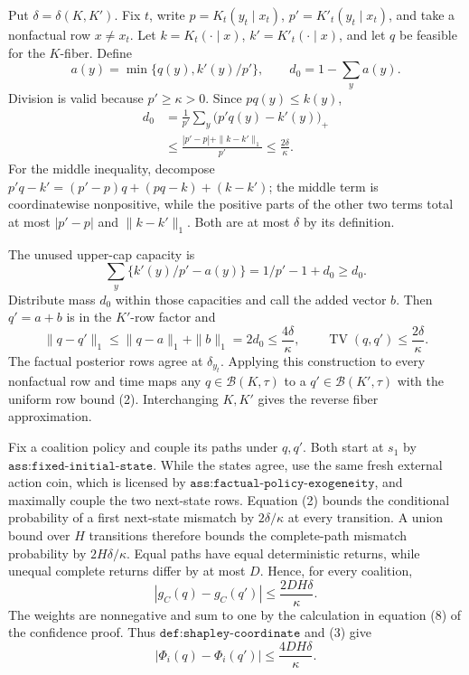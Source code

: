 Put \(\delta=\delta(K,K')\).  Fix \(t\), write \(p=K_t(y_t\mid x_t)\), \(p'=K'_t(y_t\mid x_t)\), and take a nonfactual row \(x\ne x_t\).  Let \(k=K_t(\cdot\mid x)\), \(k'=K'_t(\cdot\mid x)\), and let \(q\) be feasible for the \(K\)-fiber.  Define
\[
 a(y)=\min\{q(y),k'(y)/p'\},
 \qquad d_0=1-\sum_ya(y).
\]
Division is valid because \(p'\ge\kappa>0\).  Since \(pq(y)\le k(y)\),
\[
 \begin{aligned}
 d_0
 &=\frac1{p'}\sum_y\bigl(p'q(y)-k'(y)\bigr)_+\\
 &\le\frac{|p'-p|+\|k-k'\|_1}{p'}
 \le\frac{2\delta}{\kappa}.
 \end{aligned} \tag{1}
\]
For the middle inequality, decompose \(p'q-k'=(p'-p)q+(pq-k)+(k-k')\); the middle term is coordinatewise nonpositive, while the positive parts of the other two terms total at most \(|p'-p|\) and \(\|k-k'\|_1\).  Both are at most \(\delta\) by its definition.

The unused upper-cap capacity is
\[
 \sum_y\{k'(y)/p'-a(y)\}=1/p'-1+d_0\ge d_0.
\]
Distribute mass \(d_0\) within those capacities and call the added vector \(b\).  Then \(q'=a+b\) is in the \(K'\)-row factor and
\[
 \|q-q'\|_1\le\|q-a\|_1+\|b\|_1=2d_0
 \le\frac{4\delta}{\kappa},
 \qquad \operatorname{TV}(q,q')\le\frac{2\delta}{\kappa}. \tag{2}
\]
The factual posterior rows agree at \(\delta_{y_t}\).  Applying this construction to every nonfactual row and time maps any \(q\in\mathcal B(K,\tau)\) to a \(q'\in\mathcal B(K',\tau)\) with the uniform row bound (2).  Interchanging \(K,K'\) gives the reverse fiber approximation.

Fix a coalition policy and couple its paths under \(q,q'\).  Both start at \(s_1\) by \(\texttt{ass:fixed-initial-state}\).  While the states agree, use the same fresh external action coin, which is licensed by \(\texttt{ass:factual-policy-exogeneity}\), and maximally couple the two next-state rows.  Equation (2) bounds the conditional probability of a first next-state mismatch by \(2\delta/\kappa\) at every transition.  A union bound over \(H\) transitions therefore bounds the complete-path mismatch probability by \(2H\delta/\kappa\).  Equal paths have equal deterministic returns, while unequal complete returns differ by at most \(D\).  Hence, for every coalition,
\[
 |g_C(q)-g_C(q')|\le\frac{2DH\delta}{\kappa}. \tag{3}
\]
The weights are nonnegative and sum to one by the calculation in equation (8) of the confidence proof.  Thus \(\texttt{def:shapley-coordinate}\) and (3) give
\[
 |\Phi_i(q)-\Phi_i(q')|
 \le\frac{4DH\delta}{\kappa}. \tag{4}
\]

